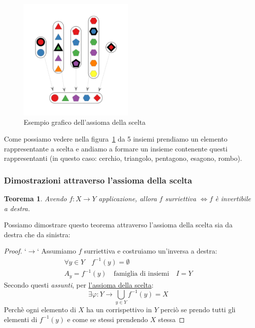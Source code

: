 \documentclass{article}
\newtheorem{theorem}{Teorema}[section]
\theoremstyle{definition}
\begin{document}
\begin{figure}[!h]
        \centering
                \includegraphics[width=0.5\textwidth]{esempio_assioma_della_scelta.jpg}
                \caption{Esempio grafico dell'assioma della scelta}\label{fig:esempio_assioma_della_scelta}
\end{figure}
Come possiamo vedere nella figura~\ref{fig:esempio_assioma_della_scelta} da 5 insiemi prendiamo un elemento rappresentante a scelta e andiamo a formare un insieme contenente questi rappresentanti (in questo caso: cerchio, triangolo, pentagono, esagono, rombo).



\subsubsection{Dimostrazioni attraverso l'assioma della scelta}
\begin{tcolorbox}
\begin{theorem}
        Avendo $ f : X \to Y $ applicazione, allora $ f $ surriettiva $ \Leftrightarrow f $ è invertibile a destra.   
\end{theorem}
\end{tcolorbox}

Possiamo dimostrare questo teorema attraverso l'assioma della scelta sia da destra che da sinistra:
\begin{tcolorbox}
\begin{proof}
       `$ \rightarrow$`  Assumiamo $ f $ surriettiva e costruiamo un'inversa a destra:
        \begin{align*}
                \forall y \in Y \quad f^{-1}(y) = \emptyset \\
                A_y = f^{-1}(y) \quad \mbox{famiglia di insiemi} \quad  I = Y
        \end{align*}
        Secondo questi \textit{assunti}, per \underline{l'assioma della scelta}:
        \begin{equation*}
                \exists \varphi : Y \to \bigcup_{y \in Y}f^{-1}(y) = X 
        \end{equation*}
        Perchè ogni elemento di $ X $ ha un corrispettivo in $ Y $ perciò se prendo tutti gli elementi di $ f^{-1}(y) $ e come se stessi prendendo $ X $ stessa    
\end{proof}
\end{tcolorbox}
\end{document}
